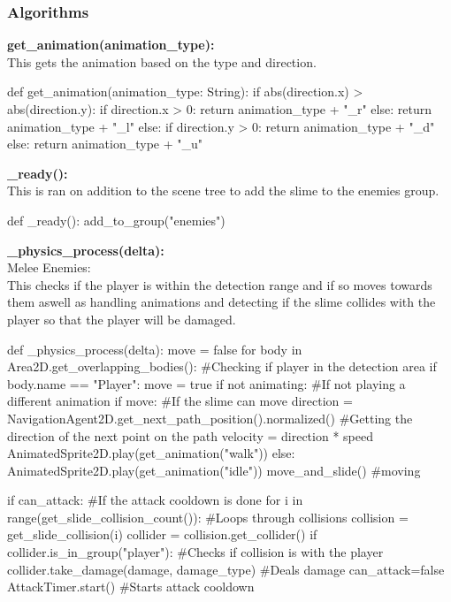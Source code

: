 \documentclass{article}
\begin{document}
        \subsubsection{Algorithms}
        \textbf{get\_animation(animation\_type):}\\
        This gets the animation based on the type and direction.\\
        \begin{python}
def get_animation(animation_type: String):
	if abs(direction.x) > abs(direction.y):
		if direction.x > 0:
			return animation_type + "_r"
		else:
			return animation_type + "_l"
	else:
		if direction.y > 0:
			return animation_type + "_d"
		else:
			return animation_type + "_u"
        \end{python}
        \textbf{\_ready():}\\
        This is ran on addition to the scene tree to add the slime to the enemies group.\\
        \begin{python}
def _ready():
   add_to_group("enemies")
        \end{python}
        \textbf{\_physics\_process(delta):}\\
        Melee Enemies:\\
        This checks if the player is within the detection range and if so moves towards them aswell as handling animations and detecting if the slime collides with the player so that the player will be damaged.\\
        \begin{python}
def _physics_process(delta):
   move = false
   for body in Area2D.get_overlapping_bodies(): #Checking if player in the detection area
      if body.name == "Player":
         move = true
   if not animating: #If not playing a different animation
      if move: #If the slime can move
         direction = NavigationAgent2D.get_next_path_position().normalized() #Getting the direction of the next point on the path
         velocity = direction * speed
         AnimatedSprite2D.play(get_animation("walk"))
      else:
         AnimatedSprite2D.play(get_animation("idle"))
   move_and_slide() #moving
                
   if can_attack: #If the attack cooldown is done
      for i in range(get_slide_collision_count()): #Loops through collisions
         collision = get_slide_collision(i)
         collider = collision.get_collider()
            if collider.is_in_group("player"): #Checks if collision is with the player
               collider.take_damage(damage, damage_type) #Deals damage
               can_attack=false 
               AttackTimer.start() #Starts attack cooldown
        \end{python}
\end{document}
